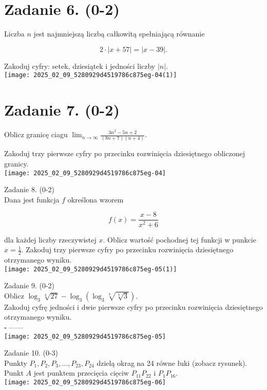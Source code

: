 \documentclass[10pt]{article}
\begin{document}
\section*{Zadanie 6. (0-2)}
Liczba \(n\) jest najmniejszą liczbą całkowitą spełniającą równanie

\[
2 \cdot|x+57|=|x-39| .
\]

Zakoduj cyfry: setek, dziesiątek i jedności liczby \(|n|\).\\
\texttt{[image: 2025\_02\_09\_5280929d4519786c875eg-04(1)]}

\section*{Zadanie 7. (0-2)}
Oblicz granicę ciagu \(\lim _{n \rightarrow \infty} \frac{3 n^{2}-5 n+2}{(8 n+7)(n+4)}\).

Zakoduj trzy pierwsze cyfry po przecinku rozwinięcia dziesiętnego obliczonej granicy.\\
\texttt{[image: 2025\_02\_09\_5280929d4519786c875eg-04]}

Zadanie 8. (0-2)\\
Dana jest funkcja \(f\) określona wzorem

\[
f(x)=\frac{x-8}{x^{2}+6}
\]

dla każdej liczby rzeczywistej \(x\). Oblicz wartość pochodnej tej funkcji w punkcie \(x=\frac{1}{2}\). Zakoduj trzy pierwsze cyfry po przecinku rozwinięcia dziesiętnego otrzymanego wyniku.\\
\texttt{[image: 2025\_02\_09\_5280929d4519786c875eg-05(1)]}

Zadanie 9. (0-2)\\
Oblicz \(\log _{3} \sqrt[4]{27}-\log _{3}\left(\log _{3} \sqrt[3]{\sqrt[3]{3}}\right)\).\\
Zakoduj cyfrę jedności i dwie pierwsze cyfry po przecinku rozwinięcia dziesiętnego otrzymanego wyniku.\\
\(\square\) ——\\
\texttt{[image: 2025\_02\_09\_5280929d4519786c875eg-05]}

Zadanie 10. (0-3)\\
Punkty \(P_{1}, P_{2}, P_{3}, \ldots, P_{23}, P_{24}\) dzielą okrag na 24 równe łuki (zobacz rysunek). Punkt \(A\) jest punktem przecięcia cięciw \(P_{11} P_{22}\) i \(P_{1} P_{16}\).\\
\texttt{[image: 2025\_02\_09\_5280929d4519786c875eg-06]}
\end{document}
